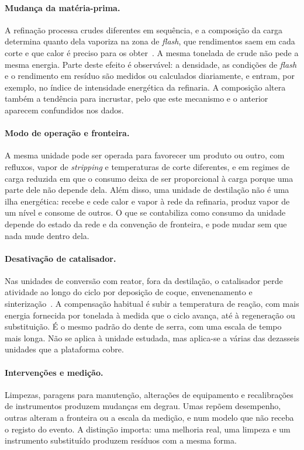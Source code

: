 \paragraph{Mudança da matéria-prima.} A refinação processa crudes diferentes
em sequência, e a composição da carga determina quanto dela vaporiza na zona
de \emph{flash}, que rendimentos saem em cada corte e que calor é preciso
para os obter~\cite{Gary2007}. A mesma tonelada de crude não pede a mesma
energia. Parte deste efeito é observável: a densidade, as condições de
\emph{flash} e o rendimento em resíduo são medidos ou calculados
diariamente, e entram, por exemplo, no índice de intensidade energética da
refinaria. A composição altera também a tendência para incrustar, pelo que
este mecanismo e o anterior aparecem confundidos nos dados.

\paragraph{Modo de operação e fronteira.} A mesma unidade pode ser operada para
favorecer um produto ou outro, com refluxos, vapor de \emph{stripping} e
temperaturas de corte diferentes, e em regimes de carga reduzida em que o
consumo deixa de ser proporcional à carga porque uma parte dele não depende
dela. Além disso, uma unidade de destilação não é uma ilha energética: recebe
e cede calor e vapor à rede da refinaria, produz vapor de um nível e consome
de outros. O que se contabiliza como consumo da unidade depende do estado da
rede e da convenção de fronteira, e pode mudar sem que nada mude dentro dela.

\paragraph{Desativação de catalisador.} Nas unidades de conversão com reator,
fora da destilação, o catalisador perde atividade ao longo do ciclo por
deposição de coque, envenenamento e sinterização~\cite{Bartholomew2001}. A
compensação habitual é subir a temperatura de reação, com mais energia
fornecida por tonelada à medida que o ciclo avança, até à regeneração ou
substituição. É o mesmo padrão do dente de serra, com uma escala de tempo mais
longa. Não se aplica à unidade estudada, mas aplica-se a várias das
dezasseis unidades que a plataforma cobre.

\paragraph{Intervenções e medição.} Limpezas, paragens para manutenção,
alterações de equipamento e recalibrações de instrumentos produzem mudanças
em degrau. Umas repõem desempenho, outras alteram a fronteira ou a escala da
medição, e  num modelo que não receba o
registo do evento. A distinção importa: uma melhoria real, uma limpeza e um instrumento
substituído produzem resíduos com a mesma forma.


